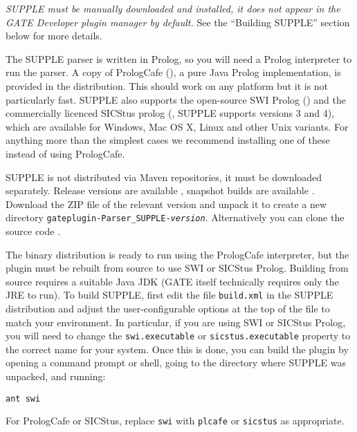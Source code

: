 \emph{SUPPLE must be manually downloaded and installed, it does not appear
in the GATE Developer plugin manager by default.}  See the ``Building SUPPLE''
section below for more details.


The SUPPLE parser is written in Prolog, so you will need a Prolog interpreter
to run the parser.  A copy of PrologCafe
(), a pure Java
Prolog implementation, is provided in the distribution.  This should work on
any platform but it is not particularly fast.  SUPPLE also supports the
open-source SWI Prolog () and the
commercially licenced SICStus prolog
(, SUPPLE supports versions 3 and 4),
which are available for Windows, Mac OS X, Linux and other Unix variants.  For
anything more than the simplest cases we recommend installing one of these
instead of using PrologCafe.


SUPPLE is not distributed via Maven repositories, it must be downloaded
separately.  Release versions are available
,
snapshot builds are available
.
Download the ZIP file of the relevant version and unpack it to create a new directory
\texttt{gateplugin-Parser\_SUPPLE-\emph{version}}.
Alternatively you can clone the source code
.

The binary distribution is ready to run using the PrologCafe interpreter, but
the plugin must be rebuilt from source to use SWI or SICStus Prolog.  Building
from source requires a suitable Java JDK (GATE itself technically requires only
the JRE to run). To build SUPPLE, first edit the file {\tt build.xml} in the
SUPPLE distribution and adjust the user-configurable options at the top of the
file to match your environment.  In particular, if you are using SWI or SICStus Prolog,
you will need to change the {\tt swi.executable} or {\tt sicstus.executable}
property to the correct name for your system. Once this is done, you can build
the plugin by opening a command prompt or shell, going to the directory where
SUPPLE was unpacked, and running:
\begin{small}\begin{verbatim}
ant swi
\end{verbatim}\end{small}
For PrologCafe or SICStus, replace {\tt swi} with {\tt plcafe} or {\tt sicstus} as
appropriate.

